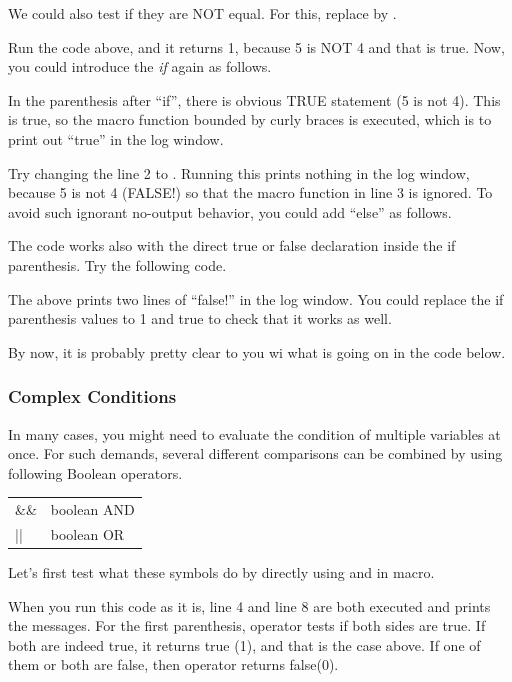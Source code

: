 We could also test if they are NOT equal. For this, replace \ilcom{==} by
\ilcom{!=}.

Run the code above, and it returns 1, because 5 is NOT 4 and that is true. Now,
you could introduce the \textit{if} again as follows.

In the parenthesis after ``if'', there is obvious TRUE statement (5 is not 4).
This is true, so the macro function bounded by curly braces is executed, which is to
print out ``true'' in the log window.

Try changing the line 2 to . Running this prints nothing
in the log window, because 5 is not 4 (FALSE!) so that the macro function in
line 3 is ignored. To avoid such ignorant no-output behavior, you could add
``else'' as follows.



The code works also with the direct true or false
declaration inside the if parenthesis. Try the following code.



The above prints two lines of ``false!'' in the log window. You could replace
the if parenthesis values to 1 and true to check that it works as well. 

By now, it is probably pretty clear to you wi what is going on in the code below. 


\subsubsection{Complex Conditions}
In many cases, you might need to evaluate the condition of multiple variables at once. 
For such demands, several different comparisons can be combined by using following Boolean operators. 

\begin{indentCom}
 \begin{tabular*}{0.5\textwidth}{ l l }
\&\& & boolean AND\\
|| & boolean OR\\
\end{tabular*}
\end{indentCom}

Let's first test what these symbols do by directly using
 and  in macro.

When you run this code as it is, line 4 and line 8 are both executed and prints
the messages. For the first  parenthesis, \ilcom{\&\&} operator tests if
both sides are true. If both are indeed true, it returns true (1), and that is
the case above. If one of them or both are false, then \ilcom{\&\&}
operator returns false(0). 

